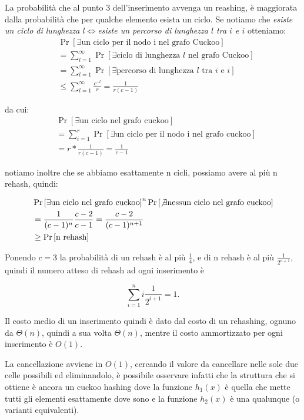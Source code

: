 La probabilità che al punto 3 dell'inserimento avvenga un reashing, è maggiorata
dalla probabilità che per qualche elemento esista un ciclo. Se notiamo che
\emph{esiste un ciclo di lunghezza $l$}$\Leftrightarrow$\emph{esiste un percorso di
lunghezza $l$ tra $i$ e $i$ } otteniamo:
\begin{align*}
    &\Pr\left[\exists \mbox{un ciclo per il nodo i nel grafo Cuckoo}\right] \\
    &= \sum_{l=1}^{\infty} \Pr\left[\exists \mbox{ciclo di lunghezza $l$ nel grafo Cuckoo}\right] \\
    &= \sum_{l=1}^{\infty} \Pr\left[\exists \mbox{percorso di lunghezza $l$ tra $i$ e $i$}\right] \\
    &\le \sum_{l=1}^{\infty} \frac{c^{-l}}{r} = \frac{1}{r(c-1)}
\end{align*}

da cui:
\begin{align*}
    &\Pr\left[\exists \mbox{un ciclo nel grafo cuckoo}\right] \\ 
    &= \sum_{i=1}^{r} \Pr\left[\exists \mbox{un ciclo per il nodo i nel grafo cuckoo}\right] \\
    &= r*\frac{1}{r(c-1)} = \frac{1}{c-1}
\end{align*}

notiamo inoltre che se abbiamo esattamente n cicli, possiamo avere al più
n rehash, quindi:

\begin{align*}
    &\Pr\left[\exists \mbox{un ciclo nel grafo cuckoo}\right]^n
        \Pr\left[\not\exists \mbox{nessun ciclo nel grafo cuckoo}\right] \\
    &= \frac{1}{(c-1)^n} \frac{c-2}{c-1} = \frac{c-2}{(c-1)^{n+1}}\\
    &\ge \Pr\left[\mbox{n rehash}\right]
\end{align*}

Ponendo $c=3$ la probabilità di un rehash è al più $\frac{1}{4}$, e di n
rehash è al più $\frac{1}{2^{n+1}}$, quindi il numero atteso di rehash ad ogni
inserimento è

\[ \sum_{i=1}^{n} i \frac{1}{2^{i+1}} = 1. \]

Il costo medio di un inserimento quindi è dato dal costo di un rehashing, 
ognuno da $\Theta(n)$, quindi a sua volta $\Theta(n)$, mentre il costo
ammortizzato per ogni inserimento è $O(1)$.

La cancellazione avviene in $O(1)$, cercando il valore da cancellare nelle sole
due celle possibili ed eliminandolo, è possibile osservare infatti che la
struttura che si ottiene è ancora un cuckoo hashing dove la funzione $h_1(x)$
è quella che mette tutti gli elementi esattamente dove sono e la funzione
$h_2(x)$ è una qualunque (o varianti equivalenti).